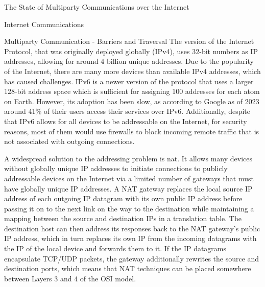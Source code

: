 \begin{frame}[fragile]{The State of Multiparty Communications over the
Internet}
\begin{block}{Internet Communications}
\begin{block}{Multiparty Communication - Barriers and Traversal}
\protect\hypertarget{multiparty-communication---barriers-and-traversal}{}
The version of the Internet Protocol, that was originally deployed
globally (IPv4), uses 32-bit numbers as IP addresses, allowing for
around 4 billion unique addresses. Due to the popularity of the
Internet, there are many more devices than available IPv4 addresses,
which has caused challenges. IPv6 is a newer version of the protocol
that uses a larger 128-bit address space which is sufficient for
assigning 100 addresses for each atom on Earth. However, its adoption
has been slow, as according to Google\autocite{IPv6Google} as of 2023
around 41\% of their users access their services over IPv6.
Additionally, despite that IPv6 allows for all devices to be addressable
on the Internet, for security reasons, most of them would use firewalls
to block incoming remote traffic that is not associated with outgoing
connections.

A widespread solution to the addressing problem is \gls{nat}. It allows
many devices without globally unique IP addresses to initiate
connections to publicly addressable devices on the Internet via a
limited number of gateways that must have globally unique IP addresses.
A NAT gateway replaces the local source IP address of each outgoing IP
datagram with its own public IP address before passing it on to the next
link on the way to the destination while maintaining a mapping between
the source and destination IPs in a translation table. The destination
host can then address its responses back to the NAT gateway's public IP
address, which in turn replaces its own IP from the incoming datagrams
with the IP of the local device and forwards them to it. If the IP
datagrams encapsulate TCP/UDP packets, the gateway additionally rewrites
the source and destination ports, which means that NAT techniques can be
placed somewhere between Layers 3 and 4 of the OSI model.


\end{block}
\end{block}
\end{frame}
